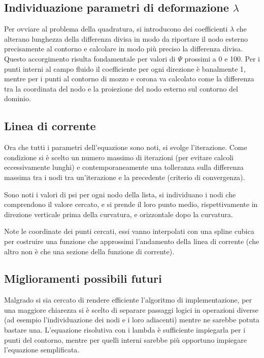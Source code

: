 \documentclass{tufte-handout}
\begin{document}
\subsection{Individuazione parametri di deformazione $\lambda$}
Per ovviare al problema della quadratura, si introducono dei coefficienti $\lambda$ che alterano lunghezza della differenza divisa in modo da riportare il nodo esterno precisamente al contorno e calcolare in modo più preciso la differenza divisa. Questo accorgimento risulta fondamentale per valori di $\Psi$ prossimi a 0 e 100. Per i punti interni al campo fluido il coefficiente per ogni direzione è banalmente 1, mentre per i punti al contorno di mozzo e corona va calcolato come la differenza tra la coordinata del nodo e la proiezione del nodo esterno sul contorno del dominio.

\subsection{Linea di corrente}
Ora che tutti i parametri dell'equazione sono noti, si svolge l'iterazione. Come condizione si è scelto un numero massimo di iterazioni (per evitare calcoli eccessivamente lunghi) e contemporaneamente una tolleranza sulla differenza massima tra i nodi tra un'iterazione e la precedente (criterio di convergenza).

Sono noti i valori di psi per ogni nodo della lista, si individuano i nodi che comprendono il valore cercato, e si prende il loro punto medio, rispettivamente in direzione verticale prima della curvatura, e orizzontale dopo la curvatura.

Note le coordinate dei punti cercati, essi vanno interpolati con una spline cubica per costruire una funzione che approssimi l'andamento della linea di corrente (che altro non è che una sezione della funzione di corrente).

\subsection{Miglioramenti possibili futuri}
Malgrado si sia cercato di rendere efficiente l'algoritmo di implementazione, per una maggiore chiarezza si è scelto di separare passaggi logici in operazioni diverse (ad esempio l'individuazione dei nodi e i loro adiacenti) mentre ne sarebbe potuta bastare una.
L'equazione risolutiva con i lambda è sufficiente impiegarla per i punti del contorno, mentre per quelli interni sarebbe più opportuno impiegare l'equazione semplificata.
\end{document}

